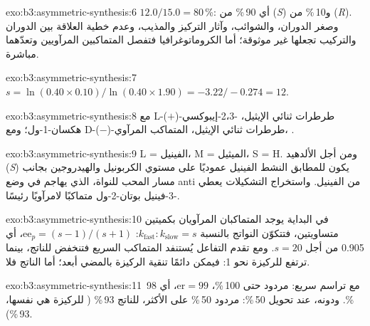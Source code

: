 \begin{solution}{exo:b3:asymmetric-synthesis:6}
 $12.0/15.0 = 80$\,\%: أي 90\,\% من (\textit{S}) و10\,\% من (\textit{R}). وصغر الدوران، والشوائب،
وآثار التركيز والمذيب، وعدم خطية العلاقة بين الدوران
والتركيب تجعلها غير موثوقة؛ أما الكروماتوغرافيا فتفصل
المتماكبين المرآويين وتعدّهما مباشرة.
\end{solution}

\begin{solution}{exo:b3:asymmetric-synthesis:7}
$s = \ln(0.40 \times 0.10)/\ln(0.40 \times 1.90) = -3.22/-0.274 = 12$.
\end{solution}

\begin{solution}{exo:b3:asymmetric-synthesis:8}
مع L-($+$)-طرطرات ثنائي الإيثيل، -2،3-إيبوكسي هكسان-1-ول؛ ومع D-($-$)-طرطرات ثنائي الإيثيل،
المتماكب المرآوي، .
\end{solution}

\begin{solution}{exo:b3:asymmetric-synthesis:9}
L = الفينيل، M = الميثيل، S = H. ومن أجل الألدهيد (\textit{S}) يكون للمطابق النشط الفينيل
عموديًا على مستوي الكربونيل والهيدروجين بجانب مسار
المحب للنواة، الذي يهاجم في وضع anti من الفينيل. واستخراج التشكيلات يعطي
-3-فينيل بوتان-2-ول متماكبًا لامرآويًا رئيسًا.
\end{solution}

\begin{solution}{exo:b3:asymmetric-synthesis:10}
في البداية يوجد المتماكبان المرآويان بكميتين متساويتين، فتتكوّن النواتج
بالنسبة $k_{\mathrm{fast}} : k_{\mathrm{slow}} = s$: $\mathrm{ee}_p = (s - 1)/(s + 1)$، أي 0.905 من أجل $s = 20$. ومع تقدم التفاعل
يُستنفد المتماكب السريع فتنخفض  للناتج، بينما ترتفع  للركيزة
نحو 1: فيمكن دائمًا تنقية الركيزة بالمضي أبعد؛ أما الناتج
فلا.
\end{solution}

\begin{solution}{exo:b3:asymmetric-synthesis:11}
مع تراسم سريع: مردود حتى 100\,\%، $\mathrm{er} = 99$، أي  98\,\%. ودونه، عند تحويل 50\,\%:
مردود 50\,\% على الأكثر،  للناتج 93\,\% ( للركيزة هي
نفسها، 93\,\%).
\end{solution}

